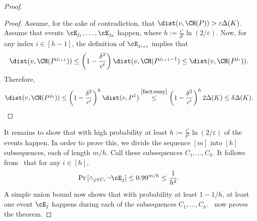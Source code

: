 \begin{proof}
\begin{claim}
\end{claim}
\begin{proof}
Assume, for the sake of contradiction, that $\dist(v,\CH(P)) > \varepsilon \Delta(K)$. 
Assume that events $\cE_{j_1}, \ldots, \cE_{j_h}$ happen, where $h :=\frac{c'}{\delta^2} \ln(2/\varepsilon). $ Now, for any index $i \in [h-1]$, the definition of $\cE_{j_{i+1}}$ implies that 
$$\dist(v, \CH(P^{j_{i+1}})) \leq \left( 1 - \frac{\delta^2}{c'} \right) \dist(v, \CH(P^{j_{i+1}-1}) \leq  \dist(v, \CH(P^{j_{i}})).$$
Therefore, 
$$\dist(v, \CH(P^{j_h})) \leq \left( 1 - \frac{\delta^2}{c'} \right)^h \dist(v, P^1) 
\stackrel{\mbox{\small{\Cref{fact:easy}}}}{\leq} \left( 1 - \frac{\delta^2}{c'} \right)^h 2 \Delta(K) \leq \delta \Delta(K). $$
\end{proof}

It remains to show that with high probability at least $h :=\frac{c'}{\delta^2} \ln(2/\varepsilon) $
of the events happen. In order to prove this, we divide the sequence $[m]$ into $[h]$ subsequences, each of length $m/h$. Call these subsequences $C_1, \ldots, C_h$. It follows from~ that for any $i \in [h]$, 
$$ \Pr \left[ \wedge_{j \in C_i} \neg \cE_j \right] \leq 0.99^{m/h} \leq \frac{1}{h^2}.$$
A simple union bound now shows that with probability at least $1-1/h$, at least one event $\cE_j$ happens during each of the subsequences $C_1, \ldots, C_h$.~ now proves the theorem. 



\end{proof}
